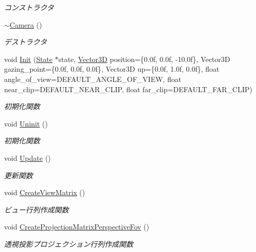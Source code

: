 \begin{DoxyCompactItemize}
\begin{DoxyCompactList}\small\item\em コンストラクタ \end{DoxyCompactList}\item 
\mbox{\hyperlink{class_camera_ad1897942d0ccf91052386388a497349f}{$\sim$\+Camera}} ()
\begin{DoxyCompactList}\small\item\em デストラクタ \end{DoxyCompactList}\item 
void \mbox{\hyperlink{class_camera_a7742a0dd5a97b1f4c9777a018feb8146}{Init}} (\mbox{\hyperlink{class_camera_1_1_state}{State}} $\ast$state, \mbox{\hyperlink{class_vector3_d}{Vector3D}} position=\{0.\+0f, 0.\+0f, -\/10.\+0f\}, Vector3\+D gazing\+\_\+point=\{0.\+0f, 0.\+0f, 0.\+0f\}, Vector3\+D up=\{0.\+0f, 1.\+0f, 0.\+0f\}, float angle\+\_\+of\+\_\+view=\+D\+E\+F\+A\+U\+L\+T\+\_\+\+A\+N\+G\+L\+E\+\_\+\+O\+F\+\_\+\+V\+I\+E\+W, float near\+\_\+clip=\+D\+E\+F\+A\+U\+L\+T\+\_\+\+N\+E\+A\+R\+\_\+\+C\+L\+I\+P, float far\+\_\+clip=\+D\+E\+F\+A\+U\+L\+T\+\_\+\+F\+A\+R\+\_\+\+C\+L\+I\+P)
\begin{DoxyCompactList}\small\item\em 初期化関数 \end{DoxyCompactList}\item 
void \mbox{\hyperlink{class_camera_a8b3337b3e560ea6a780d646bc8c509d7}{Uninit}} ()
\begin{DoxyCompactList}\small\item\em 初期化関数 \end{DoxyCompactList}\item 
void \mbox{\hyperlink{class_camera_a4a596a3ea1fdc7d244ba4268031a360b}{Update}} ()
\begin{DoxyCompactList}\small\item\em 更新関数 \end{DoxyCompactList}\item 
void \mbox{\hyperlink{class_camera_a5b4993ffb218536cb31d6d5224453b1a}{Create\+View\+Matrix}} ()
\begin{DoxyCompactList}\small\item\em ビュー行列作成関数 \end{DoxyCompactList}\item 
void \mbox{\hyperlink{class_camera_af9f52f44747bba0be03aa8dda5cf5914}{Create\+Projection\+Matrix\+Perspective\+Fov}} ()
\begin{DoxyCompactList}\small\item\em 透視投影プロジェクション行列作成関数 \end{DoxyCompactList}\item 

\end{DoxyCompactItemize}
